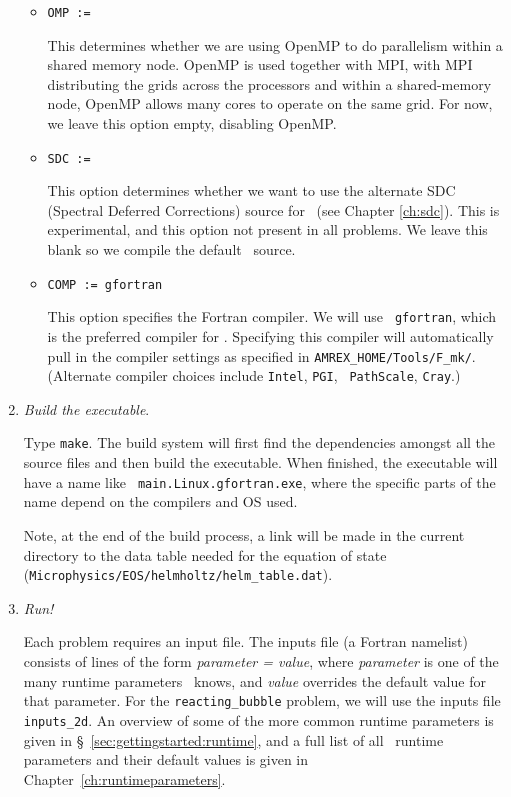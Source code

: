 \begin{enumerate}
\begin{itemize}
  \item {\tt OMP := }

    This determines whether we are using OpenMP to do parallelism
    within a shared memory node.  OpenMP is used together with MPI,
    with MPI distributing the grids across the processors and within a
    shared-memory node, OpenMP allows many cores to operate on the
    same grid.  For now, we leave this option empty, disabling OpenMP.

  \item {\tt SDC := }

    This option determines whether we want to use the alternate SDC
    (Spectral Deferred Corrections) source for \maestro\ (see Chapter
    \ref{ch:sdc}).  This is experimental, and this option not present
    in all problems.  We leave this blank so we compile the default
    \maestro\ source.

  \item {\tt COMP := gfortran}

    This option specifies the Fortran compiler.  We will use {\tt
      gfortran}, which is the preferred compiler for \maestro.
    Specifying this compiler will automatically pull in the compiler
    settings as specified in {\tt AMREX\_HOME/Tools/F\_mk/}.
    (Alternate compiler choices include {\tt Intel}, {\tt PGI}, {\tt
      PathScale}, {\tt Cray}.)

  \end{itemize}


\item {\em Build the executable}.

  Type {\tt make}.  The build system will first find the dependencies
  amongst all the source files and then build the executable.  When
  finished, the executable will have a name like {\tt
    main.Linux.gfortran.exe}, where the specific parts of the name
  depend on the compilers and OS used.

  Note, at the end of the build process, a link will be made in the
  current directory to the data table needed for the equation of state
  ({\tt Microphysics/EOS/helmholtz/helm\_table.dat}).


\item {\em Run!}

  Each problem requires an input file.  The inputs file (a Fortran
  namelist) consists of lines of the form {\em parameter = value},
  where {\em parameter} is one of the many runtime parameters
  \maestro\ knows, and {\em value} overrides the default value for
  that parameter.  For the {\tt reacting\_bubble} problem, we will use
  the inputs file {\tt inputs\_2d}.  An overview of some of the more
  common runtime parameters is given in
  \S~\ref{sec:gettingstarted:runtime}, and a full list of all
  \maestro\ runtime parameters and their default values is given in
  Chapter~\ref{ch:runtimeparameters}.


\end{enumerate}
